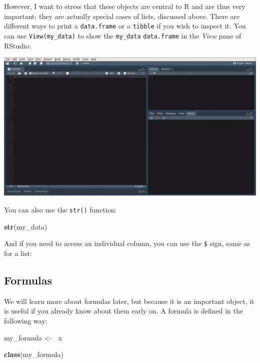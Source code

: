 \documentclass[]{gitbook}
\newenvironment{Shaded}{\begin{snugshade}}{\end{snugshade}}
\newcommand{\ErrorTok}[1]{\textcolor[rgb]{0.64,0.00,0.00}{\textbf{#1}}}
\newcommand{\KeywordTok}[1]{\textcolor[rgb]{0.13,0.29,0.53}{\textbf{#1}}}
\newcommand{\NormalTok}[1]{#1}
\newcommand{\OperatorTok}[1]{\textcolor[rgb]{0.81,0.36,0.00}{\textbf{#1}}}
\newcommand{\StringTok}[1]{\textcolor[rgb]{0.31,0.60,0.02}{#1}}
\begin{document}
However, I want to stress that these objects are central to R and are thus very important; they are
actually special cases of lists, discussed above. There are different ways to print a \texttt{data.frame} or
a \texttt{tibble} if you wish to inspect it. You can use \texttt{View(my\_data)} to show the \texttt{my\_data} \texttt{data.frame}
in the \emph{View} pane of RStudio:

\includegraphics{pics/rstudio_view_data.gif}

You can also use the \texttt{str()} function:

\begin{Shaded}
\begin{Highlighting}[]
\KeywordTok{str}\NormalTok{(my_data)}
\end{Highlighting}
\end{Shaded}

And if you need to access an individual column, you can use the \texttt{\$} sign, same as for a list:

\begin{Shaded}
\end{Shaded}

\hypertarget{formulas}{%
\subsection{Formulas}\label{formulas}}

We will learn more about formulas later, but because it is an important object, it is useful if you
already know about them early on. A formula is defined in the following way:

\begin{Shaded}
\begin{Highlighting}[]
\NormalTok{my_formula <-}\StringTok{ }\ErrorTok{~}\NormalTok{x}

\KeywordTok{class}\NormalTok{(my_formula)}
\end{Highlighting}
\end{Shaded}
\end{document}
